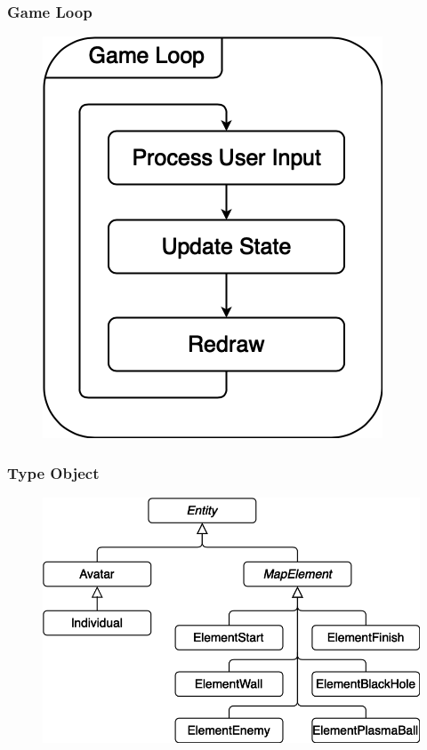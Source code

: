 \documentclass{beamer}
\begin{document}
\begin{frame}
    \frametitle{Game Loop}
    \begin{figure}\includegraphics[scale=0.4]{resources/Game_loop_flow_diagram_bb.png} 

    \end{figure}

\end{frame}

\begin{frame}
    \frametitle{Type Object}
    \begin{figure}
        \includegraphics[scale=0.3]{resources/Typed_Objects_Diagram_Entity_bb.png} 

    \end{figure}

\end{frame}
\end{document}
